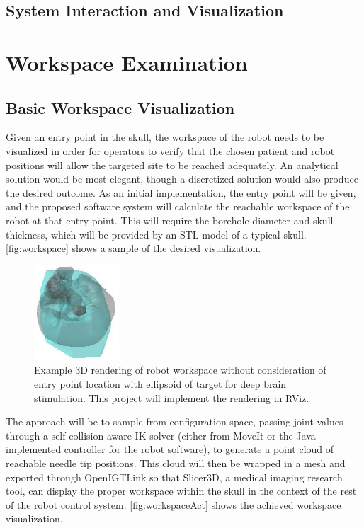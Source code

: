 \documentclass[12pt]{report}
\begin{document}
\section{System Interaction and Visualization}

\chapter{Workspace Examination}
\section{Basic Workspace Visualization}
Given an entry point in the skull, the workspace of the robot needs to be visualized in order for operators to verify that the chosen patient and robot positions will allow the targeted site to be reached adequately. An analytical solution would be most elegant, though a discretized solution would also produce the desired outcome. As an initial implementation, the entry point will be given, and the proposed software system will calculate the reachable workspace of the robot at that entry point. This will require the borehole diameter and skull thickness, which will be provided by an STL model of a typical skull. \autoref{fig:workspace} shows a sample of the desired visualization.

\begin{figure}[thpb]
	\centering
	\includegraphics[width = 1.25in, angle=180]{images/neuro_workspace.jpg}
    \caption{Example 3D rendering of robot workspace without consideration of entry point location with ellipsoid of target for deep brain stimulation. \cite{aimLabRobot} This project will implement the rendering in RViz.}
    \label{fig:workspace}
\end{figure}

The approach will be to sample from configuration space, passing joint values through a self-collision aware IK solver (either from MoveIt or the Java implemented controller for the robot software), to generate a point cloud of reachable needle tip positions. This cloud will then be wrapped in a mesh and exported through OpenIGTLink so that Slicer3D, a medical imaging research tool, can display the proper workspace within the skull in the context of the rest of the robot control system. \autoref{fig:workspaceAct} shows the achieved workspace visualization.
\end{document}
